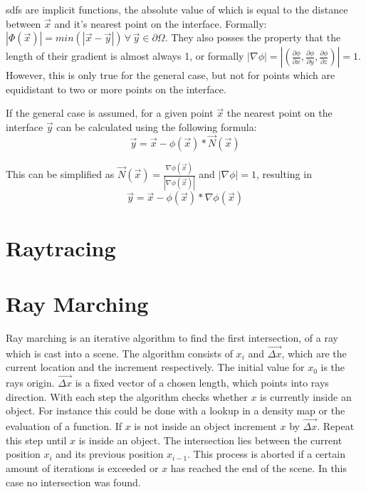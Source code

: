 \Glspl{sdf} are implicit functions, the absolute value of which is equal to the distance between $\vec{x}$ and it's nearest point on the interface. Formally:  $|\Phi(\vec{x})| = min(|\vec{x} - \vec{y}|) \, \forall \, \vec{y} \in \partial\Omega$. They also posses the property that the length of their gradient is almost always 1, or formally  $|\nabla\phi| = |(\frac{\partial\phi}{\partial x},\frac{\partial\phi}{\partial y},\frac{\partial\phi}{\partial z})| = 1$. However, this is only true for the general case, but not for points which are equidistant to two or more points on the interface.

If the general case is assumed, for a given point $\vec{x}$ the nearest point on the interface $\vec{y}$ can be calculated using the following formula:
$$\vec{y} = \vec{x} - \phi(\vec{x}) * \vec{N}(\vec{x}) $$

This can be simplified as  $\vec{N}(\vec{x}) = \frac{\nabla\phi(\vec{x})}{|\nabla\phi(\vec{x})|}$ and $|\nabla\phi| = 1$, resulting in 
$$\vec{y} = \vec{x} - \phi(\vec{x}) * \nabla\phi(\vec{x}) $$


\section{Raytracing}

\section{Ray Marching}
\cite{tuy:1984:direct} \cite{perlin:1989:hypertexture}

Ray marching is an iterative algorithm to find the first intersection, of a ray which is cast into a scene. The algorithm consists of $x_i$ and $\vec{ \Delta x}$, which are the current location and the increment respectively. The initial value for $x_0$ is the rays origin. $\vec{ \Delta x}$ is a fixed vector of a chosen length, which points into rays direction. With each step the algorithm checks whether $x$ is currently inside an object. For instance this could be done with a lookup in a density map or the evaluation of a function. If $x$ is not inside an object increment $x$ by $\vec{ \Delta x}$. Repeat this step until $x$ is inside an object. The intersection lies between the current position  $x_i$ and its previous position  $x_{i-1}$. This process is aborted if a certain amount of iterations is exceeded or $x$ has reached the end of the scene. In this case no intersection was found.

\cite{tuy:1984:direct} \cite{perlin:1989:hypertexture}



